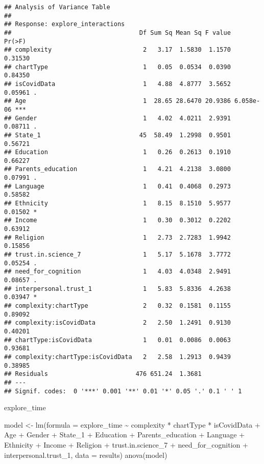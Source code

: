 \documentclass[
]{article}
\newenvironment{Shaded}{\begin{snugshade}}{\end{snugshade}}
\newcommand{\AttributeTok}[1]{\textcolor[rgb]{0.77,0.63,0.00}{#1}}
\newcommand{\FunctionTok}[1]{\textcolor[rgb]{0.00,0.00,0.00}{#1}}
\newcommand{\NormalTok}[1]{#1}
\newcommand{\OtherTok}[1]{\textcolor[rgb]{0.56,0.35,0.01}{#1}}
\newcommand{\SpecialCharTok}[1]{\textcolor[rgb]{0.00,0.00,0.00}{#1}}
\begin{document}
\begin{verbatim}
## Analysis of Variance Table
## 
## Response: explore_interactions
##                                   Df Sum Sq Mean Sq F value    Pr(>F)    
## complexity                         2   3.17  1.5830  1.1570   0.31530    
## chartType                          1   0.05  0.0534  0.0390   0.84350    
## isCovidData                        1   4.88  4.8777  3.5652   0.05961 .  
## Age                                1  28.65 28.6470 20.9386 6.058e-06 ***
## Gender                             1   4.02  4.0211  2.9391   0.08711 .  
## State_1                           45  58.49  1.2998  0.9501   0.56721    
## Education                          1   0.26  0.2613  0.1910   0.66227    
## Parents_education                  1   4.21  4.2138  3.0800   0.07991 .  
## Language                           1   0.41  0.4068  0.2973   0.58582    
## Ethnicity                          1   8.15  8.1510  5.9577   0.01502 *  
## Income                             1   0.30  0.3012  0.2202   0.63912    
## Religion                           1   2.73  2.7283  1.9942   0.15856    
## trust.in.science_7                 1   5.17  5.1678  3.7772   0.05254 .  
## need_for_cognition                 1   4.03  4.0348  2.9491   0.08657 .  
## interpersonal.trust_1              1   5.83  5.8336  4.2638   0.03947 *  
## complexity:chartType               2   0.32  0.1581  0.1155   0.89092    
## complexity:isCovidData             2   2.50  1.2491  0.9130   0.40201    
## chartType:isCovidData              1   0.01  0.0086  0.0063   0.93681    
## complexity:chartType:isCovidData   2   2.58  1.2913  0.9439   0.38985    
## Residuals                        476 651.24  1.3681                      
## ---
## Signif. codes:  0 '***' 0.001 '**' 0.01 '*' 0.05 '.' 0.1 ' ' 1
\end{verbatim}

explore\_time

\begin{Shaded}
\begin{Highlighting}[]
\NormalTok{model }\OtherTok{\textless{}{-}} \FunctionTok{lm}\NormalTok{(}\AttributeTok{formula =}\NormalTok{ explore\_time }\SpecialCharTok{\textasciitilde{}}\NormalTok{ complexity }\SpecialCharTok{*}\NormalTok{ chartType }\SpecialCharTok{*}\NormalTok{ isCovidData }\SpecialCharTok{+}
\NormalTok{              Age }\SpecialCharTok{+}\NormalTok{ Gender }\SpecialCharTok{+}\NormalTok{ State\_1 }\SpecialCharTok{+}\NormalTok{ Education }\SpecialCharTok{+}\NormalTok{ Parents\_education }\SpecialCharTok{+}\NormalTok{ Language }\SpecialCharTok{+} 
\NormalTok{              Ethnicity }\SpecialCharTok{+}\NormalTok{ Income }\SpecialCharTok{+}\NormalTok{ Religion }\SpecialCharTok{+}\NormalTok{ trust.in.science\_7 }\SpecialCharTok{+} 
\NormalTok{              need\_for\_cognition }\SpecialCharTok{+}\NormalTok{ interpersonal.trust\_1,}
            \AttributeTok{data =}\NormalTok{ results)}
\FunctionTok{anova}\NormalTok{(model)}
\end{Highlighting}
\end{Shaded}
\end{document}
